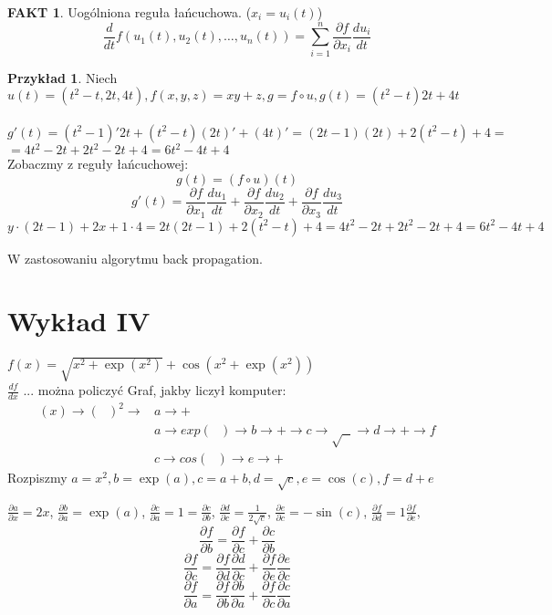 \documentclass{article}
\theoremstyle{definition}
\theoremstyle{definition}
\theoremstyle{definition}
\newtheorem{pk}{Przykład}[subsection]
\theoremstyle{definition}
\newtheorem*{fakt}{FAKT}
\begin{document}
\begin{fakt}
    Uogólniona reguła łańcuchowa. ($x_i = u_i(t)$)
    \[\frac{d}{dt} f\left(u_1(t), u_2(t), \dots, u_n(t)\right) = \sum_{i=1}^{n} \frac{\partial f}{\partial x_i} \frac{d u_i}{dt}\]
\end{fakt}

\begin{pk}
    Niech $u(t) = (t^2-t, 2t, 4t), f(x,y,z)=xy+z, g=f\circ u, g(t)=(t^2-t)2t+4t$\\\\
    $g'(t) = (t^2-1)'2t + (t^2-t)(2t)' + (4t)' = (2t-1)(2t) + 2(t^2-t) + 4=$\\
    $= 4t^2 - 2t + 2t^2 - 2t + 4 = 6t^2 - 4t + 4$\\
    Zobaczmy z reguły łańcuchowej:\\
    \[g(t)=(f\circ u)(t)\]
    \[g'(t)=\frac{\partial f}{\partial x_1} \frac{du_1}{dt} + \frac{\partial f}{\partial x_2} \frac{du_2}{dt} + \frac{\partial f}{\partial x_3} \frac{du_3}{dt}\]
    \[y\cdot (2t-1) + 2x + 1\cdot 4 = 2t (2t-1) + 2(t^2-t) + 4 = 4t^2 - 2t + 2t^2 - 2t + 4 = 6t^2 - 4t + 4\]
\end{pk}
W zastosowaniu algorytmu back propagation.

\section{Wykład IV}

$f(x)=\sqrt{x^2+\exp(x^2)} + \cos(x^2+\exp(x^2))$\\
$\frac{df}{dx}$ ... można policzyć
Graf, jakby liczył komputer:
\begin{align}
    (x) \rightarrow (\text{ })^2 \rightarrow &a \rightarrow +\\
    & a\rightarrow exp(\text{ }) \rightarrow b \rightarrow + \rightarrow c \rightarrow \sqrt{\text{ }}\rightarrow d \rightarrow + \rightarrow f\\
    & c \rightarrow cos(\text{ }) \rightarrow e \rightarrow +
\end{align}
Rozpiszmy $a=x^2, b=\exp(a), c = a+b, d=\sqrt{c}, e=\cos(c), f=d+e$

$\frac{\partial a}{\partial x} = 2x$,
$\frac{\partial b}{\partial a} = \exp(a)$,
$\frac{\partial c}{\partial a} = 1 = \frac{\partial c}{\partial b}$,
$\frac{\partial d}{\partial c} = \frac{1}{2\sqrt{c}}$,
$\frac{\partial e}{\partial c} = -\sin(c)$,
$\frac{\partial f}{\partial d} = 1 \frac{\partial f}{\partial e}$,
\[\frac{\partial f}{\partial b} = \frac{\partial f}{\partial c} + \frac{\partial c}{\partial b}\]
\[\frac{\partial f}{\partial c} = \frac{\partial f}{\partial d}\frac{\partial d}{\partial c} + \frac{\partial f}{\partial e}\frac{\partial e}{\partial c}\]
\[\frac{\partial f}{\partial a} = \frac{\partial f}{\partial b}\frac{\partial b}{\partial a} + \frac{\partial f}{\partial c}\frac{\partial c}{\partial a}\]
\end{document}
